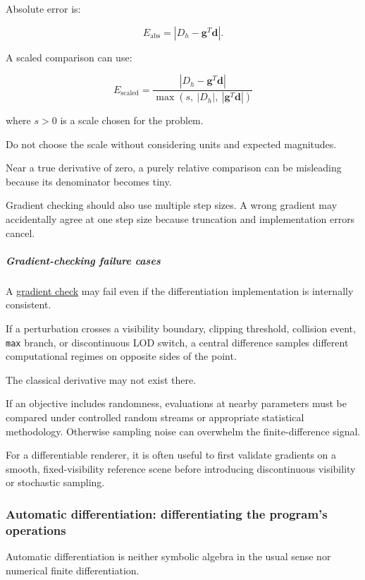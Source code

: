 Absolute error is:

\[
E_{\mathrm{abs}}= |D_h-\mathbf g^T\mathbf d|.
\]

A scaled comparison can use:

\[
\boxed{ E_{\mathrm{scaled}} = \frac{ |D_h-\mathbf g^T\mathbf d| }{ \max(s,\ |D_h|,\ |\mathbf g^T\mathbf d|) } }
\]

where \(s>0\) is a scale chosen for the problem.

Do not choose the scale without considering units and expected magnitudes.

Near a true derivative of zero, a purely relative comparison can be misleading because its denominator becomes tiny.

Gradient checking should also use multiple step sizes. A wrong gradient may accidentally agree at one step size because truncation and implementation errors cancel.

\subparagraph{Gradient-checking failure cases}\label{gradient-checking-failure-cases}

A \hyperref[02-foundations-ii-ch022]{gradient check} may fail even if the differentiation implementation is internally consistent.

If a perturbation crosses a visibility boundary, clipping threshold, collision event, \texttt{max} branch, or discontinuous LOD switch, a central difference samples different computational regimes on opposite sides of the point.

The classical derivative may not exist there.

If an objective includes randomness, evaluations at nearby parameters must be compared under controlled random streams or appropriate statistical methodology. Otherwise sampling noise can overwhelm the finite-difference signal.

For a differentiable renderer, it is often useful to first validate gradients on a smooth, fixed-visibility reference scene before introducing discontinuous visibility or stochastic sampling.

\subsubsection{Automatic differentiation: differentiating the program's operations}\label{automatic-differentiation-differentiating-the-programs-operations}

Automatic differentiation is neither symbolic algebra in the usual sense nor numerical finite differentiation.

